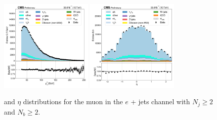 \begin{figure}[htb!]
    \centering
    \includegraphics[width=0.4\textwidth]{chapters/Analysis/sectionPlots/figures/data_mc_overlays/ejet_2016_cat_gt4_gt2_signal_linear_lepton_lepton1_pt}
    \includegraphics[width=0.4\textwidth]{chapters/Analysis/sectionPlots/figures/data_mc_overlays/ejet_2016_cat_gt4_gt2_signal_linear_lepton_lepton1_eta}
    \caption{\pt and $\eta$ distributions for the muon in the $e$ + jets
    channel with $N_{j} \geq 2$ and $N_{b} \geq 2$.
    \label{fig:analysis:plots:ejet_2_kinematic}}
\end{figure}

